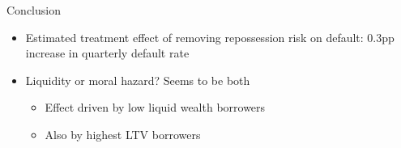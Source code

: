 \documentclass[ignorenonframetext,aspectratio=169]{beamer}
\providecommand{\tightlist}{%
  \setlength{\itemsep}{0pt}\setlength{\parskip}{0pt}}
\begin{document}
\begin{frame}{Conclusion}

\begin{itemize}
\item
  Estimated treatment effect of removing repossession risk on default:
  0.3pp increase in quarterly default rate
\item
  Liquidity or moral hazard? Seems to be both

  \begin{itemize}
  \tightlist
  \item
    Effect driven by low liquid wealth borrowers
  \item
    Also by highest LTV borrowers
  \end{itemize}
\end{itemize}

\end{frame}
\end{document}
